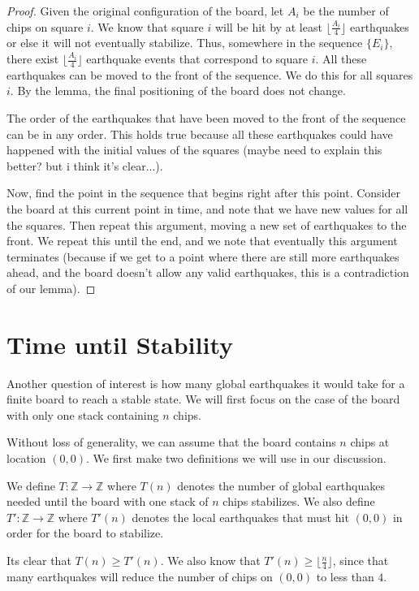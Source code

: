 \documentclass[runningheads,a4paper]{llncs}
\begin{document}
\begin{proof}
Given the original configuration of the board, let $A_i$ be the number of chips on square $i$. We know that square $i$ will be hit by at least $\lfloor \frac{A_i}{4} \rfloor$ earthquakes or else it will not eventually stabilize. Thus, somewhere in the sequence $\{E_i\}$, there exist $\lfloor \frac{A_i}{4} \rfloor$ earthquake events that correspond to square $i$. All these earthquakes can be moved to the front of the sequence. We do this for all squares $i$. By the lemma, the final positioning of the board does not change.

The order of the earthquakes that have been moved to the front of the sequence can be in any order. This holds true because all these earthquakes could have happened with the initial values of the squares (maybe need to explain this better? but i think it's clear...).

Now, find the point in the sequence that begins right after this point. Consider the board at this current point in time, and note that we have new values for all the squares. Then repeat this argument, moving a new set of earthquakes to the front. We repeat this until the end, and we note that eventually this argument terminates (because if we get to a point where there are still more earthquakes ahead, and the board doesn't allow any valid earthquakes, this is a contradiction of our lemma).

\end{proof}

\section{Time until Stability}
\label{Time until Stability}


Another question of interest is how many global earthquakes it would take for a finite board to reach a stable state. We will first focus on the case of the board with only one stack containing $n$ chips. 

Without loss of generality, we can assume that the board contains $n$ chips at location $(0,0)$. We first make two definitions we will use in our discussion.
\begin{definition}
We define $T: \mathbb{Z} \rightarrow \mathbb{Z}$ where $T(n)$ denotes the number of global earthquakes needed until the board with one stack of $n$ chips stabilizes. We also define $T':\mathbb{Z} \rightarrow \mathbb{Z}$ where $T'(n)$ denotes the local earthquakes that must hit $(0,0)$ in order for the board to stabilize. 
\end{definition}
Its clear that $T(n) \geq T'(n)$. We also know that $T'(n) \geq \lfloor \frac{n}{4}\rfloor$, since that many earthquakes will reduce the number of chips on $(0,0)$ to less than $4$.
\end{document}

